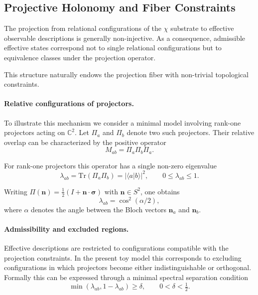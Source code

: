 \subsection{Projective Holonomy and Fiber Constraints}
  \label{subsec:projective-holonomy}

  The projection from relational configurations of the $\chi$ substrate
  to effective observable descriptions is generally non-injective.
  As a consequence, admissible effective states correspond not to single
  relational configurations but to equivalence classes under the
  projection operator.

  This structure naturally endows the projection fiber with non-trivial
  topological constraints.

  \paragraph{Relative configurations of projectors.}
    To illustrate this mechanism we consider a minimal model involving
    rank-one projectors acting on $\mathbb{C}^2$.
    Let $\Pi_a$ and $\Pi_b$ denote two such projectors.
    Their relative overlap can be characterized by the positive operator
    \begin{equation}
      M_{ab} = \Pi_a \Pi_b \Pi_a .
    \end{equation}

    For rank-one projectors this operator has a single non-zero eigenvalue
    \begin{equation}
      \lambda_{ab} = \mathrm{Tr}(\Pi_a \Pi_b) = |\langle a|b\rangle|^2 ,
      \qquad
      0 \le \lambda_{ab} \le 1 .
    \end{equation}

    Writing $\Pi(\mathbf{n})=\tfrac12(I+\mathbf{n}\cdot\boldsymbol{\sigma})$
    with $\mathbf{n}\in S^2$, one obtains
    \[
      \lambda_{ab} = \cos^2(\alpha/2),
    \]
    where $\alpha$ denotes the angle between the Bloch vectors
    $\mathbf{n}_a$ and $\mathbf{n}_b$.

  \paragraph{Admissibility and excluded regions.}
    Effective descriptions are restricted to configurations compatible
    with the projection constraints.
    In the present toy model this corresponds to excluding configurations
    in which projectors become either indistinguishable or orthogonal.
    Formally this can be expressed through a minimal spectral separation
    condition
    \begin{equation}
      \min(\lambda_{ab},1-\lambda_{ab}) \ge \delta ,
      \qquad
      0 < \delta < \tfrac12 .
    \end{equation}

